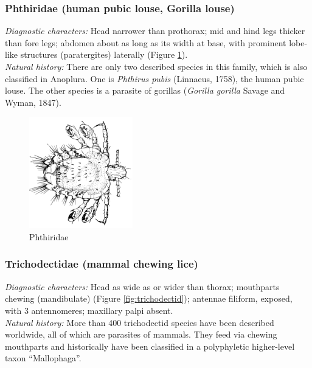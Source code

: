 \documentclass[letterpaper, 11pt]{article}
\begin{document}
\subsubsection{Phthiridae (human pubic louse, Gorilla louse)}
\noindent{}\textit{Diagnostic characters:} Head narrower than prothorax; mid and hind legs thicker than fore legs; abdomen about as long as its width at base, with prominent lobe-like structures (paratergites) laterally (Figure \ref{fig:phthirid}).\\

\noindent{}\textit{Natural history:} There are only two described species in this family, which is also classified in Anoplura. One is \textit{Phthirus pubis} (Linnaeus, 1758), the human pubic louse. The other species is a parasite of gorillas (\textit{Gorilla gorilla} Savage and Wyman, 1847).\\

\begin{figure}[ht!]
 \centering
 \includegraphics[width=0.4\textwidth]{phthirid1.png}
 \caption{Phthiridae \citep[][Fig. 176]{chandler1922animal}}
 \label{fig:phthirid}
\end{figure}

\subsubsection{Trichodectidae (mammal chewing lice)}
\noindent{}\textit{Diagnostic characters:} Head as wide as or wider than thorax; mouthparts chewing (mandibulate) (Figure \ref{fig:trichodectid}); antennae filiform, exposed, with 3 antennomeres; maxillary palpi absent. \\

\noindent{}\textit{Natural history:} More than 400 trichodectid species have been described worldwide, all of which are parasites of mammals. They feed via chewing mouthparts and historically have been classified in a polyphyletic higher-level taxon ``Mallophaga''.\\
\end{document}
